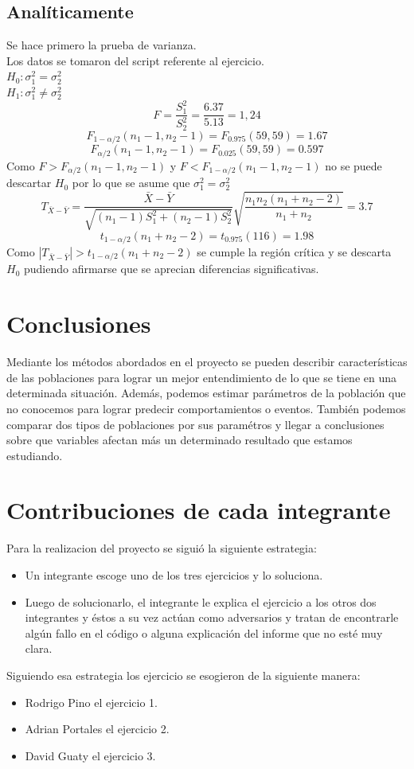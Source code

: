 \documentclass[10pt,twocolumn,a4paper]{article}
\begin{document}
\subsection*{Anal\'iticamente}
Se hace primero la prueba de varianza.\\
Los datos se tomaron del script referente al ejercicio.\\
$H_0: \sigma_1^2 = \sigma_2^2$\\
$H_1: \sigma_1^2 \ne \sigma_2^2$\\
$$
F = \frac{S_1^2}{S_2^2} = \frac{6.37}{5.13}= 1,24
$$
	$$
F_{1- \alpha /2}(n_1  - 1, n_2 - 1) = F_{0.975}(59,59) = 1.67
$$
$$
F_{\alpha/2}(n_1 -1, n_2-1) = F_{0.025}(59,59) =0.597
$$
Como $F> 	F_{\alpha/2}(n_1 -1, n_2-1)$ y $F< F_{1- \alpha /2}(n_1  - 1, n_2 - 1)$ no se puede descartar $H_0$ por lo que se asume que $\sigma_1^2 = \sigma_2^2$\\
$$
T_{\bar{X} - \bar{Y}} =	\frac{\bar{X} - \bar{Y}}{\sqrt{ (n_1 - 1)S_1^2 + (n_2 - 1)S_2^2   }}
\sqrt{\frac{n_1n_2(n_1+n_2-2)}{n_1 + n_2}} =3.7
$$
$$
t_{1-\alpha/2}(n_1+ n_2 -2) = t_{0.975}(116) =1.98
$$
Como $|T_{\bar{X} - \bar{Y}}| > t_{1-\alpha/2}(n_1+ n_2 -2)$ se cumple la regi\'on cr\'itica y se descarta $H_0$ pudiendo afirmarse que se aprecian diferencias significativas.



\section*{Conclusiones}

Mediante los m\'etodos abordados en el proyecto se pueden describir caracter\'isticas de las poblaciones para lograr un mejor entendimiento de lo que se tiene en una determinada situaci\'on. Adem\'as, podemos estimar par\'ametros de la poblaci\'on que no conocemos para lograr predecir comportamientos o eventos. Tambi\'en podemos comparar dos tipos de poblaciones por sus param\'etros y llegar a conclusiones sobre que variables afectan m\'as un determinado resultado que estamos estudiando.

\section*{Contribuciones de cada integrante}
Para la realizacion del proyecto se sigui\'o la siguiente estrategia:
\begin{itemize}
	\item Un integrante escoge uno de los tres ejercicios y lo soluciona.
	\item Luego de solucionarlo, el integrante le explica el ejercicio a los otros dos integrantes y \'estos a su vez act\'uan como adversarios y tratan de encontrarle alg\'un fallo en el c\'odigo o alguna explicaci\'on del informe que no est\'e muy clara.
\end{itemize}

	Siguiendo esa estrategia los ejercicio se esogieron de la siguiente manera:
\begin{itemize}
	\item Rodrigo Pino el ejercicio 1.
	\item Adrian Portales el ejercicio 2.
	\item David Guaty el ejercicio 3.
\end{itemize}

  
\end{document}

